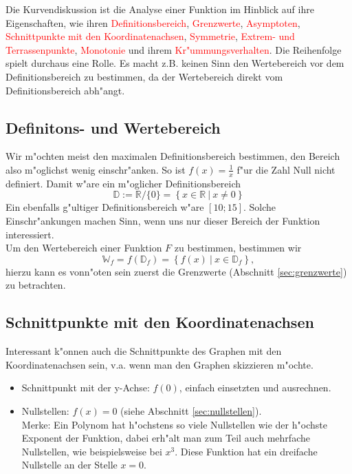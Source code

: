 Die Kurvendiskussion ist die Analyse einer Funktion im Hinblick auf ihre Eigenschaften, wie ihren \textcolor{red}{Definitionsbereich}, \textcolor{red}{Grenzwerte}, \textcolor{red}{Asymptoten}, \textcolor{red}{Schnittpunkte mit den Koordinatenachsen}, \textcolor{red}{Symmetrie}, \textcolor{red}{Extrem- und Terrassenpunkte}, \textcolor{red}{Monotonie} und ihrem \textcolor{red}{Kr"ummungsverhalten}. Die Reihenfolge spielt durchaus eine Rolle. Es macht z.B. keinen Sinn den Wertebereich vor dem Definitionsbereich zu bestimmen, da der Wertebereich direkt vom Definitionsbereich abh"angt.

\subsection{Definitons- und Wertebereich}
Wir m"ochten meist den maximalen Definitionsbereich bestimmen, den Bereich also m"oglichst wenig einschr"anken. So ist $f(x) = \frac{1}{x}$ f"ur die Zahl Null nicht definiert. Damit w"are ein m"oglicher Definitionsbereich 
\begin{equation*}
\mathbb{D} := \mathbb{R}/\{0\} = \left\{x \in \mathbb{R} \ | \ x \neq 0 \right\}
\end{equation*}
Ein ebenfalls g"ultiger Definitionsbereich w"are $\left[10;15\right]$. Solche Einschr"ankungen machen Sinn, wenn uns nur dieser Bereich der Funktion interessiert.\\
Um den Wertebereich einer Funktion $F$ zu bestimmen, bestimmen wir
\begin{equation*}
\mathbb{W}_f = f(\mathbb{D}_f) = \left\{f(x) \ | \ x \in \mathbb{D}_f \right\},
\end{equation*}
hierzu kann es vonn"oten sein zuerst die Grenzwerte (Abschnitt \ref{sec:grenzwerte}) zu betrachten.

\subsection{Schnittpunkte mit den Koordinatenachsen}
Interessant k"onnen auch die Schnittpunkte des Graphen mit den Koordinatenachsen sein, v.a. wenn man den Graphen skizzieren m"ochte.
\begin{itemize}
\item Schnittpunkt mit der y-Achse: $f(0)$, einfach einsetzten und ausrechnen.
\item Nullstellen: $f(x) = 0$ (siehe Abschnitt \ref{sec:nullstellen}).\\
Merke: Ein Polynom hat h"ochstens so viele Nullstellen wie der h"ochste Exponent der Funktion, dabei erh"alt man zum Teil auch mehrfache Nullstellen, wie beispielsweise bei $x^3$. Diese Funktion hat ein dreifache Nullstelle an der Stelle $x=0$.
\end{itemize}

